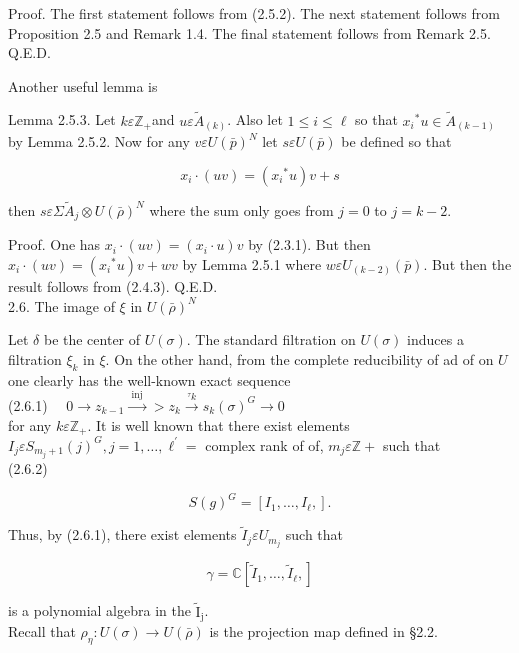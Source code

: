 \documentclass[10pt]{article}
\begin{document}
Proof. The first statement follows from (2.5.2). The next statement follows from Proposition 2.5 and Remark 1.4. The final statement follows from Remark 2.5.\\
Q.E.D.

Another useful lemma is

Lemma 2.5.3. Let $k \varepsilon \mathbb{Z}_{+}$and $u \varepsilon \tilde{A}_{(k)}$. Also let $1 \leq i \leq \ell$ so that $x_{i}{ }^{*} u \in \tilde{A}_{(k-1)}$ by Lemma 2.5.2. Now for any $v \varepsilon U(\bar{p})^{N}$ let $s \varepsilon U(\bar{p})$ be defined so that


\begin{equation*}
x_{i} \cdot(u v)=\left(x_{i}{ }^{*} u\right) v+s \tag{2.5.5}
\end{equation*}


then $s \varepsilon \Sigma \tilde{A}_{j} \otimes U(\bar{\rho})^{N}$ where the sum only goes from $j=0$ to $j=k-2$.

Proof. One has $x_{i} \cdot(u v)=\left(x_{i} \cdot u\right) v$ by (2.3.1). But then $x_{i} \cdot(u v)=\left(x_{i}{ }^{*} u\right) v+w v$ by Lemma 2.5.1 where $w \varepsilon U_{(k-2)}(\bar{p})$. But then the result follows from (2.4.3). Q.E.D.\\
2.6. The image of $\xi$ in $U(\bar{\rho})^{N}$

Let $\delta$ be the center of $U(\sigma)$. The standard filtration on $U(\sigma)$ induces a filtration $\xi_{k}$ in $\xi$. On the other hand, from the complete reducibility of ad of on $U$ one clearly has the well-known exact sequence\\
(2.6.1) $\quad 0 \rightarrow z_{k-1} \xrightarrow{\text { inj }}>z_{k} \xrightarrow{{ }^{\tau} k} s_{k}(\sigma)^{G} \rightarrow 0$\\
for any $k \varepsilon \mathbb{Z}_{+}$. It is well known that there exist elements $I_{j} \varepsilon S_{m_{j}+1}(j)^{G}, j=1, \ldots, \ell^{\prime}=$ complex rank of of, $m_{j} \varepsilon \mathbb{Z}+$ such that\\
(2.6.2)

$$
S(g)^{G}=\left[I_{1}, \ldots, I_{\ell},\right] .
$$

Thus, by (2.6.1), there exist elements $\tilde{I}_{j} \varepsilon U_{m_{j}}$ such that


\begin{equation*}
\gamma=\mathbb{C}\left[\tilde{I}_{1}, \ldots, \tilde{I}_{\ell},\right] \tag{2.6.3}
\end{equation*}


is a polynomial algebra in the $\tilde{\mathrm{I}}_{\mathrm{j}}$.\\
Recall that $\rho_{\eta}: U(\sigma) \rightarrow U(\bar{\rho})$ is the projection map defined in §2.2.
\end{document}
